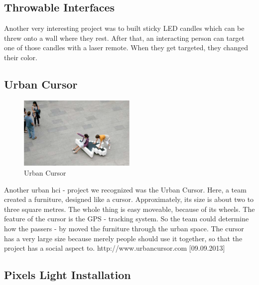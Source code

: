 \subsection{Throwable Interfaces}
Another very interesting project was to built sticky LED candles which can be threw onto a wall where they rest. After that, an interacting person can target one of those candles with a laser remote. When they get targeted, they changed their color. \newline

\subsection{Urban Cursor}

\begin{figure}[h!]
	\centering
	\includegraphics[width=0.5\textwidth, clip=true, keepaspectratio=true]{./pic/urban_cursor.png}
	\caption{Urban Cursor}
	\label{fig:urban_cursor}
\end{figure}

Another urban hci - project we recognized was the Urban Cursor.\newline 
Here, a team created a furniture, designed like a cursor. Approximately, its size is about two to three square metres. The whole thing is easy moveable, because of its wheels. The feature of the cursor is the GPS - tracking system. So the team could determine how the passers - by moved the furniture through the urban space.\newline
The cursor has a very large size because merely people should use it together, so that the project has a social aspect to.
http://www.urbancursor.com [09.09.2013] 

\subsection{Pixels Light Installation}


